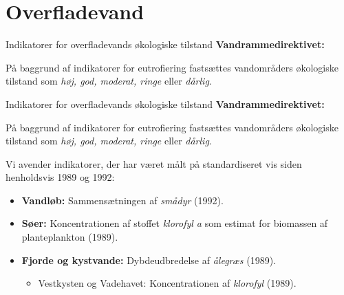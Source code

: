 \section{Overfladevand}

\begin{frame}{Indikatorer for overfladevands økologiske tilstand}
  \textbf{Vandrammedirektivet:}\par
  På baggrund af indikatorer for eutrofiering fastsættes vandområders økologiske tilstand som \textit{høj, god, moderat, ringe} eller \textit{dårlig}.
  \vfill
\end{frame}
\begin{frame}{Indikatorer for overfladevands økologiske tilstand}
  \textbf{Vandrammedirektivet:}\par
  På baggrund af indikatorer for eutrofiering fastsættes vandområders økologiske tilstand som \textit{høj, god, moderat, ringe} eller \textit{dårlig}.\par
  \vspace{0.5\baselineskip}
  Vi avender indikatorer, der har været målt på standardiseret vis siden henholdsvis 1989 og 1992:
  \begin{itemize}
    \item \textbf{Vandløb:} Sammensætningen af \textit{smådyr} (1992).
    \item \textbf{Søer:} Koncentrationen af stoffet \textit{klorofyl a} som estimat for biomassen af planteplankton (1989).
    \item \textbf{Fjorde og kystvande:} Dybdeudbredelse af \textit{ålegræs} (1989).
    \begin{itemize}
      \item Vestkysten og Vadehavet: Koncentrationen af \textit{klorofyl} (1989).
    \end{itemize}
  \end{itemize}
\end{frame}

